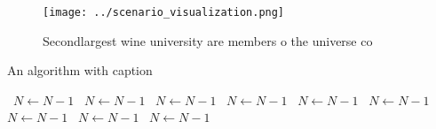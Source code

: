 \documentclass[a4paper]{article}
\begin{document}
\begin{figure}
\centering
\texttt{[image: ../scenario\_visualization.png]}
\caption{Secondlargest wine university are members o the universe co
}
\end{figure}
 
\begin{algorithm}
\caption{An algorithm with caption}
\begin{algorithmic}
\    \State $N \gets N - 1$
\    \State $N \gets N - 1$
\    \State $N \gets N - 1$
\    \State $N \gets N - 1$
\    \State $N \gets N - 1$
\    \State $N \gets N - 1$
\    \State $N \gets N - 1$
\    \State $N \gets N - 1$
\    \State $N \gets N - 1$
\EndWhile
\end{algorithmic}
\end{algorithm}
\end{document}
